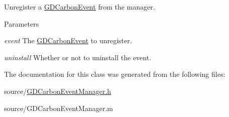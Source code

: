 Unregister a \hyperlink{interface_g_d_carbon_event}{GDCarbonEvent} from the manager. 
\begin{DoxyParams}{Parameters}
\item[{\em event}]The \hyperlink{interface_g_d_carbon_event}{GDCarbonEvent} to unregister. \item[{\em uninstall}]Whether or not to uninstall the event. \end{DoxyParams}


The documentation for this class was generated from the following files:\begin{DoxyCompactItemize}
\item 
source/\hyperlink{_g_d_carbon_event_manager_8h}{GDCarbonEventManager.h}\item 
source/GDCarbonEventManager.m\end{DoxyCompactItemize}
